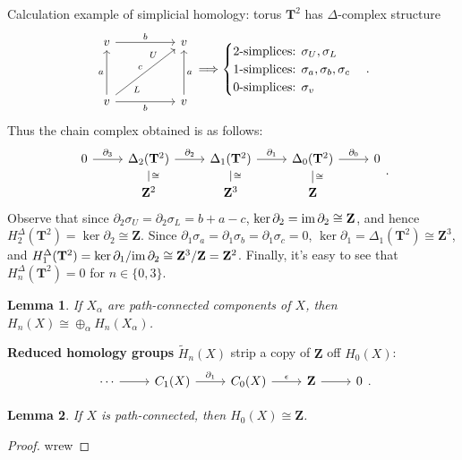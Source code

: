 \documentclass[11pt]{article}
\theoremstyle{definition}
\theoremstyle{plain}
\newtheorem*{lemma}{Lemma}
\theoremstyle{remark}
\newcommand{\im}{\textup{im}\,}
\newcommand{\Z}{\mathbf{Z}}
\begin{document}
Calculation example of simplicial homology: torus $\mathbf{T}^2$ has $\Delta$-complex structure
\[\begin{tikzcd}[column sep=huge,row sep=huge]
v\arrow{r}{b}&v\\
v\arrow{u}{a}\arrow[swap]{r}{b}\arrow[ur,"U" near end,"L"' near start,"c"]&v\arrow[swap]{u}{a}
\end{tikzcd}\Longrightarrow\begin{cases}
\textrm{2-simplices: }\sigma_U,\sigma_L\\
\textrm{1-simplices: }\sigma_a,\sigma_b,\sigma_c\\
\textrm{0-simplices: }\sigma_v
\end{cases}.\]
Thus the chain complex obtained is as follows:
\[\begin{tikzcd}[row sep=small]
0\arrow{r}{\partial_3}&\Delta_2(\mathbf{T}^2)\arrow[dash]{d}{\cong}\arrow{r}{\partial_2}&\Delta_1(\mathbf{T}^2)\arrow[dash]{d}{\cong}\arrow{r}{\partial_1}&\Delta_0(\mathbf{T}^2)\arrow{r}{\partial_0}\arrow[dash]{d}{\cong}&0\\
&\Z^2&\Z^3&\Z
\end{tikzcd}.\]
Observe that since $\partial_2\sigma_U=\partial_2\sigma_L=b+a-c$, $\ker\partial_2=\im\partial_2\cong\Z$, and hence
$H_2^\Delta(\mathbf{T}^2)=\ker\partial_2\cong\Z$. Since $\partial_1\sigma_a=\partial_1\sigma_b=\partial_1\sigma_c=0$, $\ker\partial_1=\Delta_1(\mathbf{T}^2)\cong\Z^3$, and $H_1^\Delta(\mathbf{T}^2)=\ker\partial_1/\im\partial_2\cong\Z^3/\Z=\Z^2$. Finally, it's easy to see that $H_n^\Delta(\mathbf{T}^2)=0$ for $n\in\{0,3\}$.

\begin{lemma}
If $X_\alpha$ are path-connected components of $X$, then $H_n(X)\cong\oplus_\alpha H_n(X_\alpha)$.
\end{lemma}

\textbf{Reduced homology groups} $\widetilde{H}_n(X)$ strip a copy of $\Z$ off $H_0(X)$:
\[\begin{tikzcd}
\cdots\arrow{r}&C_1(X)\arrow{r}{\partial_1}&C_0(X)\arrow{r}{\epsilon}&\Z\arrow[r]&0
\end{tikzcd}.\]

\begin{lemma}
If $X$ is path-connected, then $H_0(X)\cong\Z$.
\end{lemma}
\begin{proof}
wrew
\end{proof}
\end{document}
